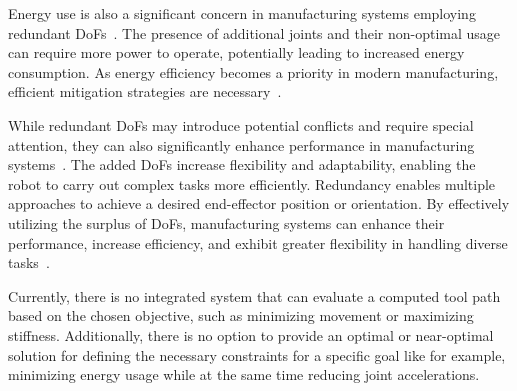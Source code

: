 Energy use is also a significant concern in manufacturing systems employing redundant \acrshort{DoF}s~\cite{Doan.2016}. The presence of additional joints and their non-optimal usage can require more power to operate, potentially leading to increased energy consumption. As energy efficiency becomes a priority in modern manufacturing, efficient mitigation strategies are necessary~\cite{Boscariol.2020, Boscariol.2019}. 

\newpage
While redundant \acrshort{DoF}s may introduce potential conflicts and require special attention, they can also significantly enhance performance in manufacturing systems~\cite{Ayten.2016}. The added \acrshort{DoF}s increase flexibility and adaptability, enabling the robot to carry out complex tasks more efficiently. Redundancy enables multiple approaches to achieve a desired end-effector position or orientation. By effectively utilizing the surplus of \acrshort{DoF}s, manufacturing systems can enhance their performance, increase efficiency, and exhibit greater flexibility in handling diverse tasks~\cite{Boscariol.2020}. 

Currently, there is no integrated system that can evaluate a computed tool path based on the chosen objective, such as minimizing movement or maximizing stiffness. %
Additionally, there is no option to provide an optimal or near-optimal solution for defining the necessary constraints for a specific goal like for example, minimizing energy usage while at the same time reducing joint accelerations.


